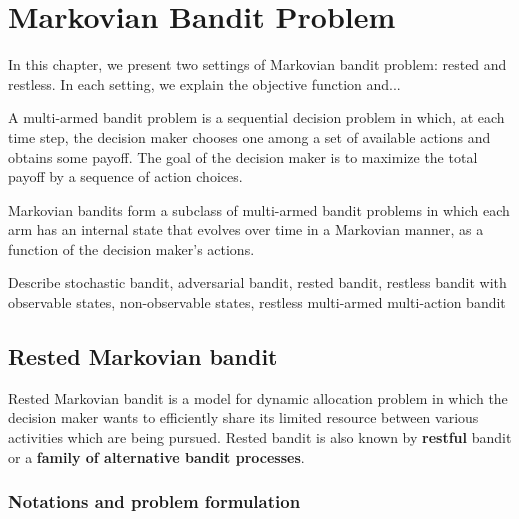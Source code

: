 \begingroup
\let\clearpage\relax

\chapter{Markovian Bandit Problem}
\label{ch:mb}

In this chapter, we present two settings of Markovian bandit problem: rested and restless.
In each setting, we explain the objective function and...

A multi-armed bandit problem is a sequential decision problem in which, at each time step, the decision maker chooses one among a set of available actions and obtains some payoff.
The goal of the decision maker is to maximize the total payoff by a sequence of action choices.

Markovian bandits form a subclass of multi-armed bandit problems in which each arm has an internal state that evolves over time in a Markovian manner, as a function of the decision maker’s actions.

Describe stochastic bandit, adversarial bandit, rested bandit, restless bandit with observable states, non-observable states, restless multi-armed multi-action bandit

\section{Rested Markovian bandit}
\label{sec:rested_mab}

Rested Markovian bandit is a model for dynamic allocation problem in which the decision maker wants to efficiently share its limited resource between various activities which are being pursued.
Rested bandit is also known by \textbf{restful} bandit or a \textbf{family of alternative bandit processes}.


\subsection{Notations and problem formulation}
\label{ssec:rested_formul}

